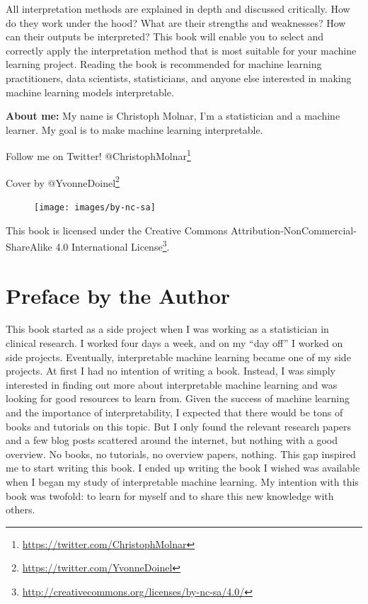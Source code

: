 \documentclass[
  11pt,
]{scrbook}
\renewcommand{\href}[2]{#2\footnote{\url{#1}}}
\begin{document}
All interpretation methods are explained in depth and discussed critically.
How do they work under the hood?
What are their strengths and weaknesses?
How can their outputs be interpreted?
This book will enable you to select and correctly apply the interpretation method that is most suitable for your machine learning project.
Reading the book is recommended for machine learning practitioners, data scientists, statisticians, and anyone else interested in making machine learning models interpretable.

\textbf{About me:} My name is Christoph Molnar, I'm a statistician and a machine learner.
My goal is to make machine learning interpretable.

Follow me on Twitter! \href{https://twitter.com/ChristophMolnar}{@ChristophMolnar}

Cover by \href{https://twitter.com/YvonneDoinel}{@YvonneDoinel}

\begin{figure}

{\centering \texttt{[image: images/by-nc-sa]} 

}

\end{figure}

This book is licensed under the \href{http://creativecommons.org/licenses/by-nc-sa/4.0/}{Creative Commons Attribution-NonCommercial-ShareAlike 4.0 International License}.

\hypertarget{preface-by-the-author}{%
\chapter{Preface by the Author}\label{preface-by-the-author}}

This book started as a side project when I was working as a statistician in clinical research.
I worked four days a week, and on my ``day off'' I worked on side projects.
Eventually, interpretable machine learning became one of my side projects.
At first I had no intention of writing a book.
Instead, I was simply interested in finding out more about interpretable machine learning and was looking for good resources to learn from.
Given the success of machine learning and the importance of interpretability, I expected that there would be tons of books and tutorials on this topic.
But I only found the relevant research papers and a few blog posts scattered around the internet, but nothing with a good overview.
No books, no tutorials, no overview papers, nothing.
This gap inspired me to start writing this book.
I ended up writing the book I wished was available when I began my study of interpretable machine learning.
My intention with this book was twofold: to learn for myself and to share this new knowledge with others.
\end{document}
